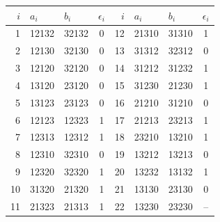 \begingroup\small\ttfamily
\begin{tabular}{rllc@{\qquad}rllc}
$i$ & $a_i$ & $b_i$ & $\epsilon_i$ & $i$ & $a_i$ & $b_i$ & $\epsilon_i$ \\ \hline
1 & 12132 & 32132 & 0 & 12 & 21310 & 31310 & 1 \\
2 & 12130 & 32130 & 0 & 13 & 31312 & 32312 & 0 \\
3 & 12120 & 32120 & 0 & 14 & 31212 & 31232 & 1 \\
4 & 13120 & 23120 & 0 & 15 & 31230 & 21230 & 1 \\
5 & 13123 & 23123 & 0 & 16 & 21210 & 31210 & 0 \\
6 & 12123 & 12323 & 1 & 17 & 21213 & 23213 & 1 \\
7 & 12313 & 12312 & 1 & 18 & 23210 & 13210 & 1 \\
8 & 12310 & 32310 & 0 & 19 & 13212 & 13213 & 0 \\
9 & 12320 & 32320 & 1 & 20 & 13232 & 13132 & 1 \\
10 & 31320 & 21320 & 1 & 21 & 13130 & 23130 & 0 \\
11 & 21323 & 21313 & 1 & 22 & 13230 & 23230 & -- \\
\end{tabular}\endgroup
